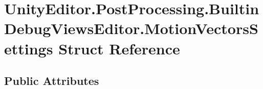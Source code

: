 \hypertarget{struct_unity_editor_1_1_post_processing_1_1_builtin_debug_views_editor_1_1_motion_vectors_settings}{}\section{Unity\+Editor.\+Post\+Processing.\+Builtin\+Debug\+Views\+Editor.\+Motion\+Vectors\+Settings Struct Reference}
\label{struct_unity_editor_1_1_post_processing_1_1_builtin_debug_views_editor_1_1_motion_vectors_settings}
\subsection*{Public Attributes}
